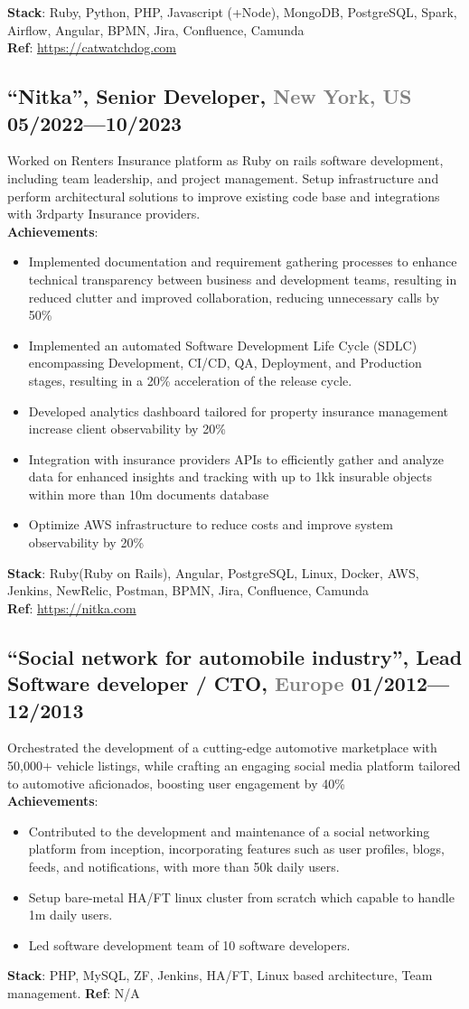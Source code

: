 \documentclass[9pt]{extarticle}
\newcommand{\datedsubsection}[2]{%
  \subsection[#1]{\small\bfseries #1 \hfill\small #2}%
}
\begin{document}
\textbf{Stack}: Ruby, Python, PHP, Javascript (+Node), MongoDB, PostgreSQL, Spark, Airflow, Angular, BPMN, Jira, Confluence, Camunda\\
\textbf{Ref}: \href{https://catwatchdog.com}{https://catwatchdog.com}

\datedsubsection{``Nitka'', \textbf{Senior Developer}, \textcolor{gray}{New York, US}}{05/2022---10/2023}
Worked on Renters Insurance platform as Ruby on rails software development, including team leadership, and project management. Setup infrastructure and perform architectural solutions to improve existing code base and integrations with 3rdparty Insurance providers.\\
\textbf{Achievements}:
\begin{itemize}
  \item{ Implemented documentation and requirement gathering processes to enhance technical transparency between business and development teams, resulting in reduced clutter and improved collaboration, reducing unnecessary calls by 50\% }
  \item{ Implemented an automated Software Development Life Cycle (SDLC) encompassing Development, CI/CD, QA, Deployment, and Production stages, resulting in a 20\% acceleration of the release cycle.  }
  \item{ Developed analytics dashboard tailored for property insurance management increase client observability by 20\% }
  \item{ Integration with insurance providers APIs to efficiently gather and analyze data for enhanced insights and tracking with up to 1kk insurable objects within more than 10m documents database }
  \item{ Optimize AWS infrastructure to reduce costs and improve system observability by 20\% }
\end{itemize}
\textbf{Stack}: Ruby(Ruby on Rails), Angular, PostgreSQL, Linux, Docker, AWS, Jenkins, NewRelic, Postman, BPMN, Jira, Confluence, Camunda\\
\textbf{Ref}: \href{https://nitka.com}{https://nitka.com}


\datedsubsection{``Social network for automobile industry'', \textbf{Lead Software developer / CTO}, \textcolor{gray}{Europe}}{01/2012---12/2013}
Orchestrated the development of a cutting-edge automotive marketplace with 50,000+ vehicle listings, while crafting an engaging social media platform tailored to automotive aficionados, boosting user engagement by 40\%\\
\textbf{Achievements}:
\begin{itemize}
  \item{ Contributed to the development and maintenance of a social networking platform from inception, incorporating features such as user profiles, blogs, feeds, and notifications, with more than 50k daily users. }
  \item{ Setup bare-metal HA/FT linux cluster from scratch which capable to handle 1m daily users. }
  \item{ Led software development team of 10 software developers. }
\end{itemize}
\textbf{Stack}: PHP, MySQL, ZF, Jenkins, HA/FT, Linux based architecture, Team management.
\textbf{Ref}: N/A
\end{document}
